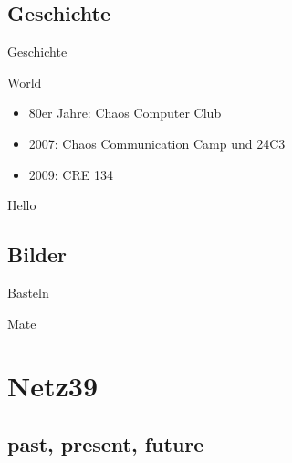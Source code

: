 \documentclass[hyperref={pdfpagelabels=false}]{beamer}
\begin{document}
\subsection{Geschichte}

\begin{frame}[label=secgeschichte]{Geschichte}
    \begin{block}{World}
        \begin{itemize}
            \item 80er Jahre: Chaos Computer Club
            \item 2007: Chaos Communication Camp und 24C3
                \cite{Ohlig2007}
            \item 2009: CRE 134 \cite{Pritlove2009}
        \end{itemize}
    \end{block}
    \pause
    \begin{block}{Hello}
        \begin{center}
        \end{center}
    \end{block}
\end{frame}

\subsection{Bilder}

\begin{frame}[label=secreprap]{Basteln}
    \begin{figure}
    \end{figure}
\end{frame}

\begin{frame}[label=secmatetags]{Mate}
    \begin{figure}
    \end{figure}
\end{frame}

\section{Netz39}

\subsection{past, present, future}
\end{document}
